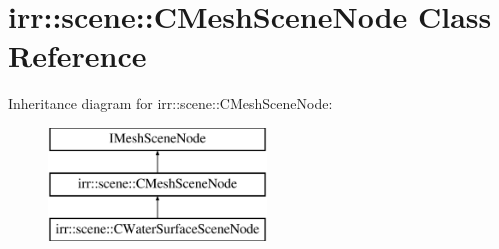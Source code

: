 \hypertarget{classirr_1_1scene_1_1_c_mesh_scene_node}{\section{irr\-:\-:scene\-:\-:C\-Mesh\-Scene\-Node Class Reference}
\label{classirr_1_1scene_1_1_c_mesh_scene_node}
}
Inheritance diagram for irr\-:\-:scene\-:\-:C\-Mesh\-Scene\-Node\-:\begin{figure}[H]
\begin{center}
\leavevmode
\includegraphics[height=3.000000cm]{classirr_1_1scene_1_1_c_mesh_scene_node}
\end{center}
\end{figure}
